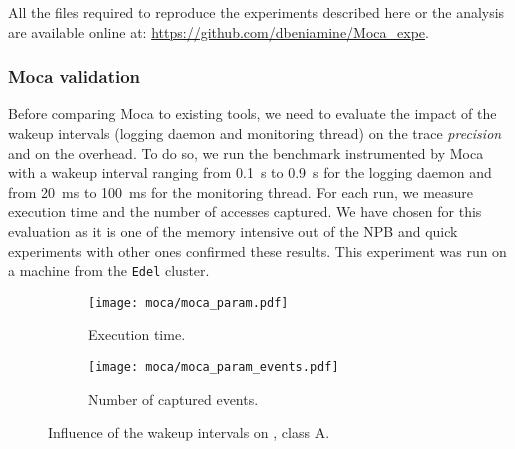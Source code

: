 All the files required to reproduce the experiments described here or the analysis are available online at: \url{https://github.com/dbeniamine/Moca\_expe}.


\subsubsection{Moca validation}
\label{sec:expe-param}

Before comparing \gls{Moca} to existing tools, we need to evaluate the impact of the wakeup intervals (logging daemon and monitoring thread) on the trace \emph{precision} and on the overhead.
To do so, we run the \IS benchmark instrumented by \gls{Moca} with a wakeup interval ranging from \SI{0.1}{s} to  \SI{0.9}{s} for the logging daemon and from \SI{20}{ms} to \SI{100}{ms} for the monitoring thread.
For each run, we measure \IS execution time and the number of accesses captured.
We have chosen \IS for this evaluation as it is one of the memory intensive out of the \gls{NPB} and quick experiments with other ones confirmed these results.
This experiment was run on a machine from the \texttt{Edel} cluster.

\begin{figure}[htb]
    \centering
    \begin{subfigure}{.73\linewidth}
        \texttt{[image: moca/moca\_param.pdf]}
        \caption{Execution time.}
        \label{fig:param_time}
    \end{subfigure}
    \begin{subfigure}{.73\linewidth}
        \texttt{[image: moca/moca\_param\_events.pdf]}
        \caption{Number of captured events.}
        \label{fig:param_evts}
    \end{subfigure}
    \caption[Influence of Moca wakeup intervals.]{Influence of the wakeup intervals on \IS, class A.}
    \label{fig:param}
\end{figure}


